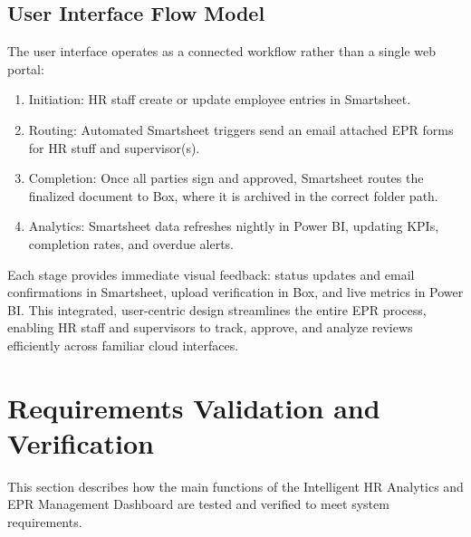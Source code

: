 \documentclass[12pt]{article}
\def\textbf#1{#1}%
\def\&{ and }%
\begin{document}
\subsection{User Interface Flow Model}
The user interface operates as a connected workflow rather than a single web portal:

\begin{enumerate}[nosep]
  \item \textbf{Initiation:} HR staff create or update employee entries in Smartsheet.  
  \item \textbf{Routing:} Automated Smartsheet triggers send an email attached EPR forms for HR stuff and supervisor(s).  
  \item \textbf{Completion:} Once all parties sign and approved, Smartsheet routes the finalized document to Box, where it is archived in the correct folder path.  
  \item \textbf{Analytics:} Smartsheet data refreshes nightly in Power BI, updating KPIs, completion rates, and overdue alerts.
\end{enumerate}

Each stage provides immediate visual feedback: status updates and email confirmations in Smartsheet, upload verification in Box, and live metrics in Power BI.  
This integrated, user-centric design streamlines the entire EPR process, enabling HR staff and supervisors to track, approve, and analyze reviews efficiently across familiar cloud interfaces.

\section{Requirements Validation and Verification}

This section describes how the main functions of the Intelligent HR Analytics \& EPR Management Dashboard are tested and verified to meet system requirements.
\end{document}
